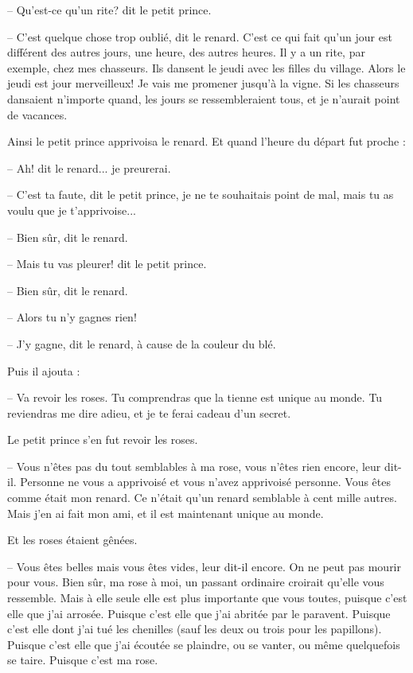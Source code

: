 \documentclass[a4paper]{report}
\begin{document}
-- Qu'est-ce qu'un rite? dit le petit prince.

-- C'est quelque chose trop oublié, dit le renard. C'est ce qui fait qu'un jour est différent des autres jours, une heure, des autres heures. Il y a un rite, par exemple, chez mes chasseurs. Ils dansent le jeudi avec les filles du village. Alors le jeudi est jour merveilleux! Je vais me promener jusqu'à la vigne. Si les chasseurs dansaient n'importe quand, les jours se ressembleraient tous, et je n'aurait point de vacances.


Ainsi le petit prince apprivoisa le renard. Et quand l'heure du départ fut proche :

-- Ah! dit le renard... je preurerai.

-- C'est ta faute, dit le petit prince, je ne te souhaitais point de mal, mais tu as voulu que je t'apprivoise...

-- Bien sûr, dit le renard.

-- Mais tu vas pleurer! dit le petit prince.

-- Bien sûr, dit le renard.

-- Alors tu n'y gagnes rien!

-- J'y gagne, dit le renard, à cause de la couleur du blé.

Puis il ajouta :

-- Va revoir les roses. Tu comprendras que la tienne est unique au monde. Tu reviendras me dire adieu, et je te ferai cadeau d'un secret.

Le petit prince s'en fut revoir les roses.

-- Vous n'êtes pas du tout semblables à ma rose, vous n'êtes rien encore, leur dit-il. Personne ne vous a apprivoisé et vous n'avez apprivoisé personne. Vous êtes comme était mon renard. Ce n'était qu'un renard semblable à cent mille autres. Mais j'en ai fait mon ami, et il est maintenant unique au monde.

Et les roses étaient gênées.

-- Vous êtes belles mais vous êtes vides, leur dit-il encore. On ne peut pas mourir pour vous. Bien sûr, ma rose à moi, un passant ordinaire croirait qu'elle vous ressemble. Mais à elle seule elle est plus importante que vous toutes, puisque c'est elle que j'ai arrosée. Puisque c'est elle que j'ai abritée par le paravent. Puisque c'est elle dont j'ai tué les chenilles (sauf les deux ou trois pour les papillons). Puisque c'est elle que j'ai écoutée se plaindre, ou se vanter, ou même quelquefois se taire. Puisque c'est ma rose.
\end{document}
